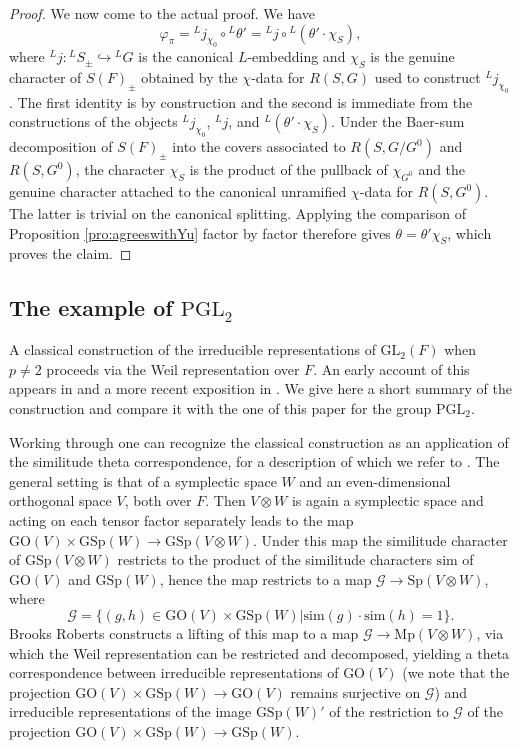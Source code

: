 \documentclass{article}
\def\mc#1{\mathcal{#1}}
\def\tx#1{\textrm{#1}}
\theoremstyle{definition}
\numberwithin{equation}{subsection}
\renewcommand{\-}{\hyp{}}
\begin{document}
\begin{proof}
	We now come to the actual proof. We have
	\[ \varphi_\pi = {^Lj_{\chi_0}}\circ{^L\theta'} = {^Lj}\circ {^L(\theta'\cdot\chi_S)}, \]
	where $^Lj : {^LS}_\pm \hookrightarrow {^LG}$ is the canonical $L$-embedding and $\chi_S$ is the genuine character of $S(F)_\pm$ obtained by the $\chi$-data for $R(S,G)$ used to construct ${^{L}}j_{\chi_0}$. The first identity is by construction and the second is immediate from the constructions of the objects $^Lj_{\chi_0}$, $^Lj$, and $^L(\theta'\cdot\chi_S)$. Under the Baer-sum decomposition of $S(F)_\pm$ into the covers associated to $R(S,G/G^0)$ and $R(S,G^0)$, the character $\chi_S$ is the product of the pullback of $\chi_{G^0}$ and the genuine character attached to the canonical unramified $\chi$-data for $R(S,G^0)$. The latter is trivial on the canonical splitting. Applying the comparison of Proposition \ref{pro:agreeswithYu} factor by factor therefore gives $\theta=\theta'\chi_S$, which proves the claim.
\end{proof}

\subsection{The example of $\tx{PGL}_2$} \label{sub:pgl2}

A classical construction of the irreducible representations of $\tx{GL}_2(F)$ when $p \neq 2$ proceeds via the Weil representation over $F$. An early account of this appears in \cite{JL79} and a more recent exposition in \cite[Chapter 9]{BH06}. We give here a short summary of the construction and compare it with the one of this paper for the group $\tx{PGL}_2$.

Working through \cite[\S39]{BH06} one can recognize the classical construction as an application of the similitude theta correspondence, for a description of which we refer to \cite[\S20.4.2]{GanKudlaTakedaTheta}. The general setting is that of a symplectic space $W$ and an even-dimensional orthogonal space $V$, both over $F$. Then $V \otimes W$ is again a symplectic space and acting on each tensor factor separately leads to the map $\tx{GO}(V) \times \tx{GSp}(W) \to \tx{GSp}(V \otimes W)$. Under this map the similitude character of $\tx{GSp}(V \otimes W)$ restricts to the product of the similitude characters $\mathrm{sim}$ of $\tx{GO}(V)$ and $\tx{GSp}(W)$, hence the map restricts to a map $\mc{G} \to \tx{Sp}(V \otimes W)$, where 
\[ \mc{G} = \{(g,h) \in \tx{GO}(V) \times \tx{GSp}(W)|\tx{sim}(g)\cdot \tx{sim}(h)=1\}. \]
Brooks Roberts \cite{Roberts96} constructs a lifting of this map to a map $\mc{G} \to \tx{Mp}(V \otimes W)$, via which the Weil representation can be restricted and decomposed, yielding a theta correspondence between irreducible representations of $\tx{GO}(V)$ (we note that the projection $\tx{GO}(V) \times \tx{GSp}(W) \to \tx{GO}(V)$ remains surjective on $\mc{G}$) and irreducible representations of the image $\tx{GSp}(W)'$ of the restriction to $\mc{G}$ of the projection $\tx{GO}(V) \times \tx{GSp}(W) \to \tx{GSp}(W)$.
\end{document}
